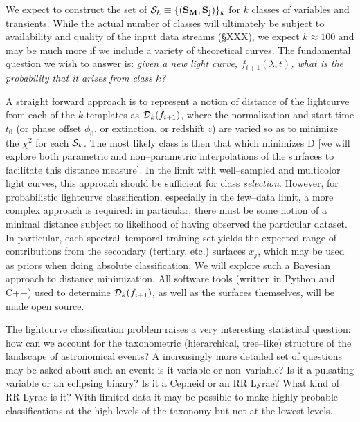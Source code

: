  \smallskip

We expect to construct the set of  ${\cal S}_k \equiv \{({\bf S_M},{\bf
S_j})\}_k$ for $k$ classes of variables and transients. While the actual number
of classes will ultimately be subject to availability and quality of the input
data streams (\S XXX), we expect $k \approx 100$ and may be much more if we
include a variety of theoretical curves. The fundamental question we wish to
answer is: {\it given a new light curve, $f_{i+1}(\lambda, t)$, what is the
probability that it arises from class $k$?}

A straight forward approach is to represent a notion of distance of the
lightcurve from each of the $k$ templates as ${\cal D}_k(f_{i+1})$, where the
normalization and start time $t_0$ (or phase offset $\phi_0$, or extinction, or
redshift $z$) are varied so as to minimize the $\chi^2$ for each ${\cal S}_k$.
The most likely class is then that which minimizes {\cal D} [we will explore
both parametric and non--parametric interpolations of the surfaces to facilitate
this distance measure]. In the limit with well--sampled and multicolor light
curves, this approach should be sufficient for class {\it selection}. However,
for probabilistic lightcurve classification, especially in the few--data limit,
a more complex approach is required: in particular, there must be some notion of
a minimal distance subject to likelihood of having observed the particular
dataset.  In particular, each spectral--temporal training set yields the
expected range of contributions from the secondary (tertiary, etc.) surfaces
$x_j$, which may be used as priors when doing absolute classification. We will
explore such a Bayesian approach to distance minimization.  All software tools
(written in Python and C++) used to determine ${\cal D}_k(f_{i+1})$, as well as
the surfaces themselves,  will be made open source.

The lightcurve classification problem raises a very interesting statistical
question: how can we account for the taxonometric (hierarchical, tree--like)
structure of the landscape of astronomical events? A increasingly more detailed
set of questions may be asked about such an event: is it variable or
non--variable? Is it a pulsating variable or an eclipsing binary?  Is it a
Cepheid or an RR Lyrae? What kind of RR Lyrae is it?  With limited data it may
be possible to make highly probable classifications at the high levels of the
taxonomy but not at the lowest levels.

